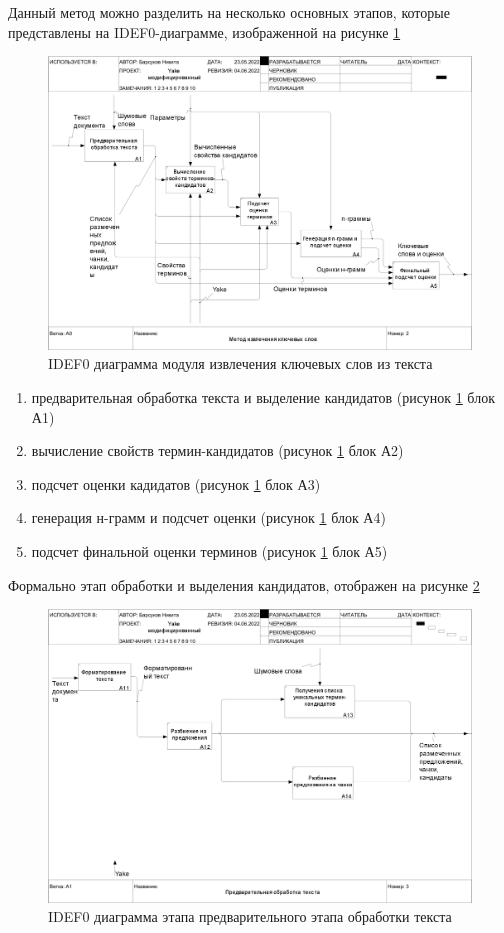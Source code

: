 Данный метод можно разделить на несколько основных этапов, которые представлены на IDEF0-диаграмме, изображенной на рисунке \ref{fig:02a0}
\begin{figure}[!h]
	\centering
	\includegraphics[width=1\linewidth]{src/img/idef0/Yake/02_A0}
	\caption{IDEF0 диаграмма модуля извлечения ключевых слов из текста}
	\label{fig:02a0}
\end{figure}

\begin{enumerate}
	\item предварительная обработка текста и выделение кандидатов (рисунок \ref{fig:02a0} блок А1)
	\item вычисление свойств термин-кандидатов (рисунок \ref{fig:02a0} блок А2)
	\item подсчет оценки кадидатов (рисунок \ref{fig:02a0} блок А3)
	\item генерация н-грамм и подсчет оценки (рисунок \ref{fig:02a0} блок А4)
	\item подсчет финальной оценки терминов (рисунок \ref{fig:02a0} блок А5)
\end{enumerate}

Формально этап обработки и выделения кандидатов, отображен на рисунке \ref{fig:03a1}
\begin{figure}[!h]
	\centering
	\includegraphics[width=1\linewidth]{src/img/idef0/Yake/03_A1}
	\caption{IDEF0 диаграмма этапа предварительного этапа обработки текста}
	\label{fig:03a1}
\end{figure}

